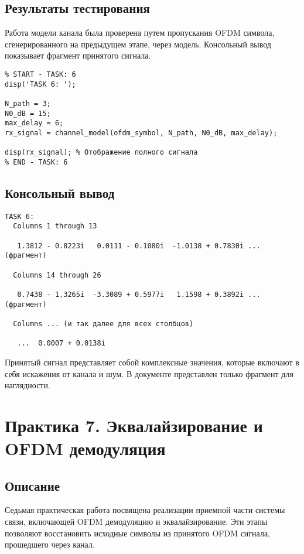 \subsection{Результаты тестирования}
Работа модели канала была проверена путем пропускания OFDM символа, сгенерированного на предыдущем этапе, через модель. Консольный вывод показывает фрагмент принятого сигнала.

\begin{verbatim}
% START - TASK: 6
disp('TASK 6: ');

N_path = 3;
N0_dB = 15;
max_delay = 6;
rx_signal = channel_model(ofdm_symbol, N_path, N0_dB, max_delay);

disp(rx_signal); % Отображение полного сигнала
% END - TASK: 6
\end{verbatim}

\subsection{Консольный вывод}
\begin{verbatim}
TASK 6:
  Columns 1 through 13

   1.3812 - 0.8223i   0.0111 - 0.1080i  -1.0138 + 0.7830i ... (фрагмент)

  Columns 14 through 26

   0.7438 - 1.3265i  -3.3089 + 0.5977i   1.1598 + 0.3892i ... (фрагмент)

  Columns ... (и так далее для всех столбцов)

   ...  0.0007 + 0.0138i
\end{verbatim}
Принятый сигнал представляет собой комплексные значения, которые включают в себя искажения от канала и шум. В документе представлен только фрагмент для наглядности.

\section{Практика 7. Эквалайзирование и OFDM демодуляция}

\subsection{Описание}
Седьмая практическая работа посвящена реализации приемной части системы связи, включающей OFDM демодуляцию и эквалайзирование. Эти этапы позволяют восстановить исходные символы из принятого OFDM сигнала, прошедшего через канал.

